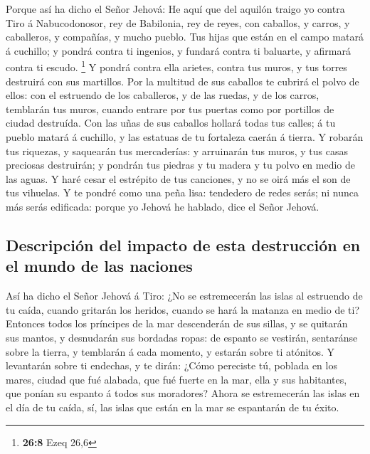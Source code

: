  Porque así ha dicho el Señor Jehová: He aquí que del
aquilón traigo yo contra Tiro á Nabucodonosor, rey de Babilonia, rey de
reyes, con caballos, y carros, y caballeros, y compañías, y mucho
pueblo.  Tus hijas que están en el campo matará á cuchillo;
y pondrá contra ti ingenios, y fundará contra ti baluarte, y afirmará
contra ti escudo. \footnote{\textbf{26:8} Ezeq 26,6}  Y
pondrá contra ella arietes, contra tus muros, y tus torres destruirá con
sus martillos.  Por la multitud de sus caballos te cubrirá
el polvo de ellos: con el estruendo de los caballeros, y de las ruedas,
y de los carros, temblarán tus muros, cuando entrare por tus puertas
como por portillos de ciudad destruída.  Con las uñas de
sus caballos hollará todas tus calles; á tu pueblo matará á cuchillo, y
las estatuas de tu fortaleza caerán á tierra.  Y robarán
tus riquezas, y saquearán tus mercaderías: y arruinarán tus muros, y tus
casas preciosas destruirán; y pondrán tus piedras y tu madera y tu polvo
en medio de las aguas.  Y haré cesar el estrépito de tus
canciones, y no se oirá más el son de tus vihuelas.  Y te
pondré como una peña lisa: tendedero de redes serás; ni nunca más serás
edificada: porque yo Jehová he hablado, dice el Señor Jehová.

\hypertarget{descripciuxf3n-del-impacto-de-esta-destrucciuxf3n-en-el-mundo-de-las-naciones}{%
\subsection{Descripción del impacto de esta destrucción en el mundo de
las
naciones}\label{descripciuxf3n-del-impacto-de-esta-destrucciuxf3n-en-el-mundo-de-las-naciones}}

 Así ha dicho el Señor Jehová á Tiro: ¿No se estremecerán
las islas al estruendo de tu caída, cuando gritarán los heridos, cuando
se hará la matanza en medio de ti?  Entonces todos los
príncipes de la mar descenderán de sus sillas, y se quitarán sus mantos,
y desnudarán sus bordadas ropas: de espanto se vestirán, sentaránse
sobre la tierra, y temblarán á cada momento, y estarán sobre ti
atónitos.  Y levantarán sobre ti endechas, y te dirán:
¿Cómo pereciste tú, poblada en los mares, ciudad que fué alabada, que
fué fuerte en la mar, ella y sus habitantes, que ponían su espanto á
todos sus moradores?  Ahora se estremecerán las islas en el
día de tu caída, sí, las islas que están en la mar se espantarán de tu
éxito.

